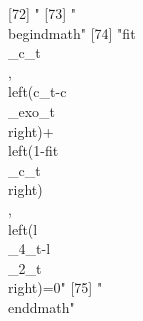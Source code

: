  [72] "%
 [73] "\\begin{dmath}"                                                                                                                                                                                                                                                                                                                                                                                                                                                                                                                                                                                                                               
 [74] "{{fit\\_c}_{t}}\\, \\left({c_{t}}-{{c\\_exo}_{t}}\\right)+\\left(1-{{fit\\_c}_{t}}\\right)\\, \\left({{l\\_4}_{t}}-{{l\\_2}_{t}}\\right)=0"                                                                                                                                                                                                                                                                                                                                                                                                                                                                                                   
 [75] "\\end{dmath}"                                                                                                                                                                                                                                                                                                                                                                                                                                                                                                                                                                                                                                 
